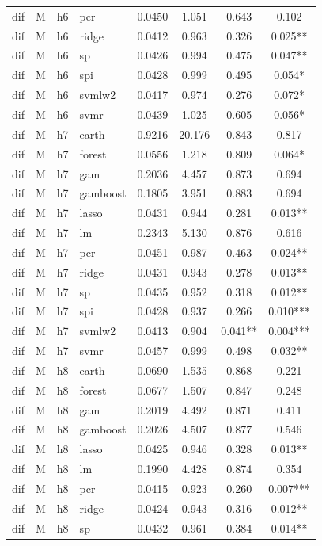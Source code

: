 \begin{ThreePartTable}
\begin{longtable}[t]{llclcccc}
dif & M & h6 & pcr & 0.0450 & 1.051 & 0.643 & 0.102\\
dif & M & h6 & ridge & 0.0412 & 0.963 & 0.326 & 0.025**\\
dif & M & h6 & sp & 0.0426 & 0.994 & 0.475 & 0.047**\\
dif & M & h6 & spi & 0.0428 & 0.999 & 0.495 & 0.054*\\
dif & M & h6 & svmlw2 & 0.0417 & 0.974 & 0.276 & 0.072*\\
dif & M & h6 & svmr & 0.0439 & 1.025 & 0.605 & 0.056*\\
\addlinespace
dif & M & h7 & earth & 0.9216 & 20.176 & 0.843 & 0.817\\
dif & M & h7 & forest & 0.0556 & 1.218 & 0.809 & 0.064*\\
dif & M & h7 & gam & 0.2036 & 4.457 & 0.873 & 0.694\\
dif & M & h7 & gamboost & 0.1805 & 3.951 & 0.883 & 0.694\\
dif & M & h7 & lasso & 0.0431 & 0.944 & 0.281 & 0.013**\\
dif & M & h7 & lm & 0.2343 & 5.130 & 0.876 & 0.616\\
dif & M & h7 & pcr & 0.0451 & 0.987 & 0.463 & 0.024**\\
dif & M & h7 & ridge & 0.0431 & 0.943 & 0.278 & 0.013**\\
dif & M & h7 & sp & 0.0435 & 0.952 & 0.318 & 0.012**\\
dif & M & h7 & spi & 0.0428 & 0.937 & 0.266 & 0.010***\\
dif & M & h7 & svmlw2 & 0.0413 & 0.904 & 0.041** & 0.004***\\
dif & M & h7 & svmr & 0.0457 & 0.999 & 0.498 & 0.032**\\
\addlinespace
dif & M & h8 & earth & 0.0690 & 1.535 & 0.868 & 0.221\\
dif & M & h8 & forest & 0.0677 & 1.507 & 0.847 & 0.248\\
dif & M & h8 & gam & 0.2019 & 4.492 & 0.871 & 0.411\\
dif & M & h8 & gamboost & 0.2026 & 4.507 & 0.877 & 0.546\\
dif & M & h8 & lasso & 0.0425 & 0.946 & 0.328 & 0.013**\\
dif & M & h8 & lm & 0.1990 & 4.428 & 0.874 & 0.354\\
dif & M & h8 & pcr & 0.0415 & 0.923 & 0.260 & 0.007***\\
dif & M & h8 & ridge & 0.0424 & 0.943 & 0.316 & 0.012**\\
dif & M & h8 & sp & 0.0432 & 0.961 & 0.384 & 0.014**\\

\end{longtable}
\end{ThreePartTable}
